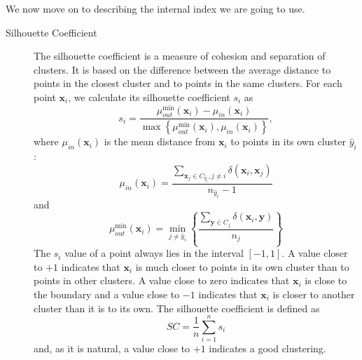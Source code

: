 \documentclass[a4paper]{article}
\begin{document}
	We now move on to describing the internal index we are going to use.
	\begin{description}
		\item[Silhouette Coefficient] The silhouette coefficient is a measure of cohesion and separation of clusters. It is based on the difference between the average distance to points in the closest cluster and to points in the same clusters. For each point $\boldsymbol{x}_{i}$, we calculate its silhouette coefficient $s_{i}$ as
		\begin{equation*}
		s_{i} = \frac{\mu_{out}^{\min}\left(\boldsymbol{x}_{i}\right) - \mu_{in}\left(\boldsymbol{x}_{i}\right)}{\max\left\{\mu_{out}^{\min}\left(\boldsymbol{x}_{i}\right), \mu_{in}\left(\boldsymbol{x}_{i}\right) \right\}},
		\end{equation*}
		where $\mu_{in}\left( \boldsymbol{x}_{i} \right)$ is the mean distance from $\boldsymbol{x}_{i}$ to points in its own cluster $\hat{y}_{i}$:
		\begin{equation*}
		\mu_{in}\left( \boldsymbol{x}_{i} \right) = \frac{\sum_{\boldsymbol{x}_{j} \in C_{\hat{y}_{i}}, j \neq i} \delta \left(\boldsymbol{x}_{i}, \boldsymbol{x}_{j}\right)}{n_{\hat{y}_{i}} - 1}
		\end{equation*}
		and
		\begin{equation*}
		\mu_{out}^{\min} \left(\boldsymbol{x}_{i}\right) = \min_{j \neq \hat{y}_{i}} \left\{ \frac{\sum_{\boldsymbol{y} \in C_{j}} \delta \left(\boldsymbol{x}_{i}, \boldsymbol{y}\right)} {n_{j}} \right\}
		\end{equation*}
		The $s_{i}$ value of a point always lies in the interval $\left[-1,1\right]$. A value closer to $+1$ indicates that $\boldsymbol{x}_{i}$ is much closer to points in its own cluster than to points in other clusters. A value close to zero indicates that $\boldsymbol{x}_{i}$ is close to the boundary and a value close to $-1$ indicates that $\boldsymbol{x}_{i}$ is closer to another cluster than it is to its own.
		The silhouette coefficient is defined as
		\begin{equation*}
		SC = \frac{1}{n} \sum_{i=1}^{n} s_{i}
		\end{equation*}
		and, as it is natural, a value close to $+1$ indicates a good clustering.
	\end{description}
\end{document}
